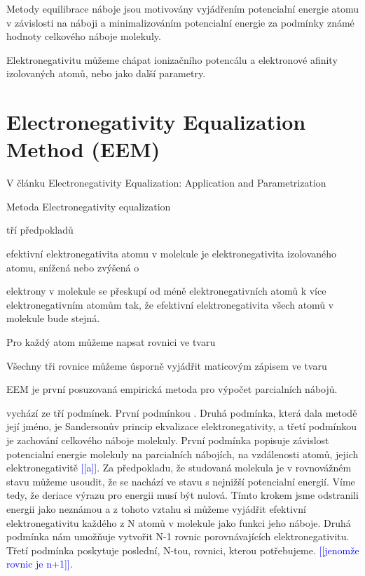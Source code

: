 \documentclass[10pt,draft,oneside]{fithesis2}
\newcommand\todo[1]{\textcolor{blue}{[[#1]]}}
\begin{document}




Metody equilibrace náboje jsou motivovány vyjádřením potencialní energie atomu v závislosti na náboji a minimalizováním potencialní energie za podmínky známé hodnoty celkového náboje molekuly.

Elektronegativitu můžeme chápat ionizačního potencálu a elektronové afinity izolovaných atomů, nebo jako další parametry.

\section{Electronegativity Equalization Method (EEM)}

V článku Electronegativity Equalization: Application and Parametrization



Metoda Electronegativity equalization

tří předpokladů

efektivní elektronegativita atomu v molekule je elektronegativita izolovaného atomu, snížená nebo zvýšená o

elektrony v molekule se přeskupí od méně elektronegativních atomů k více elektronegativním atomům tak, že efektivní elektronegativita všech atomů v molekule bude stejná.

Pro každý atom můžeme napsat rovnici ve tvaru

Všechny tři rovnice můžeme úsporně vyjádřit maticovým zápisem ve tvaru


EEM je první posuzovaná empirická metoda pro výpočet parcialních nábojů.

vychází ze tří podmínek. První podmínkou . Druhá podmínka, která dala metodě její jméno, je Sandersonův princip ekvalizace elektronegativity, a třetí podmínkou je zachování celkového náboje molekuly. První podmínka popisuje závislost potencialní energie molekuly na parcialních nábojích, na vzdálenosti atomů, jejich elektronegativitě \todo{a}. Za předpokladu, že studovaná molekula je v rovnovážném stavu můžeme usoudit, že se nachází ve stavu s nejnižší potencialní energií. Víme tedy, že deriace výrazu pro energii musí být nulová. Tímto krokem jsme odstranili energii jako neznámou a z tohoto vztahu si můžeme vyjádřit efektivní elektronegativitu každého z N atomů v molekule jako funkci jeho náboje. Druhá podmínka nám umožňuje vytvořit N-1 rovnic porovnávajících elektronegativitu. Třetí podmínka poskytuje poslední, N-tou, rovnici, kterou potřebujeme. \todo{jenomže rovnic je n+1}.
\end{document}
